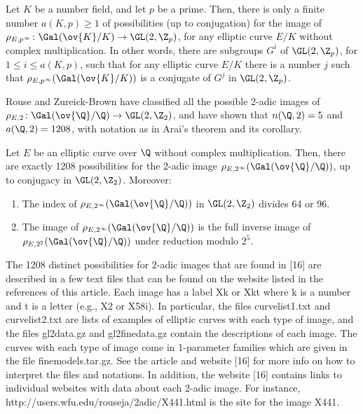 \begin{cor} %
Let $K$ be a number field, and let $p$ be a prime. Then, there is only a finite number
$a(K,p) \geq 1$ of possibilities (up to conjugation) for the image of $\rho_{E,p^\infty} \colon \Gal(\ov{K}/K) \to \GL(2,\Z_p)$, for any elliptic curve $E/K$ without complex multiplication. In other words, there are subgroups $G^i$ of $\GL(2,\Z_p)$, for $1 \leq i \leq a(K,p)$, such that for any elliptic curve $E/K$ there is a number $j$ such that $\rho_{E,p^\infty}(\Gal(\ov{K}/K))$ is a conjugate of $G^j$ in $\GL(2,\Z_p)$.
\end{cor}


Rouse and Zureick-Brown have classified all the possible 2-adic images of $\rho_{E,2} \colon \Gal(\ov{\Q}/\Q) \to \GL(2,\Z_2)$, and have shown that $n(\Q,2)= 5$ and $a(\Q,2)= 1208$, with notation as in Arai’s theorem and its corollary.


\begin{thm} %
Let $E$ be an elliptic curve over $\Q$ without complex multiplication. Then, there are exactly 1208 possibilities for the 2-adic image $\rho_{E,2^\infty}(\Gal(\ov{\Q}/\Q))$, up to conjugacy in $\GL(2,\Z_2)$. Moreover:
	\begin{enumerate}[(1)]
	\item The index of $\rho_{E,2^\infty}(\Gal(\ov{\Q}/\Q))$ in $\GL(2,\Z_2)$ divides 64 or 96.
	\item The image of $\rho_{E,2^\infty}(\Gal(\ov{\Q}/\Q))$ is the full inverse image of $\rho_{E,2^5}(\Gal(\ov{\Q}/\Q))$ under reduction modulo $2^5$. 
	\end{enumerate}
\end{thm}


The 1208 distinct possibilities for 2-adic images that are found in [16] are described
in a few text files that can be found on the website listed in the references of this article. Each image has a label Xk or Xkt where k is a number and t is a letter (e.g., X2 or X58i). In particular, the files curvelist1.txt and curvelist2.txt are lists of examples of elliptic curves with each type of image, and the files gl2data.gz and gl2finedata.gz contain the descriptions of each image. The curves with each type of image come in 1-parameter families which are given in the file finemodels.tar.gz. See the article and website [16] for more info on how to interpret the files and notations. In addition, the website [16] contains links to individual websites with data about each 2-adic image. For instance, http://users.wfu.edu/rouseja/2adic/X441.html is the site for the image X441.


